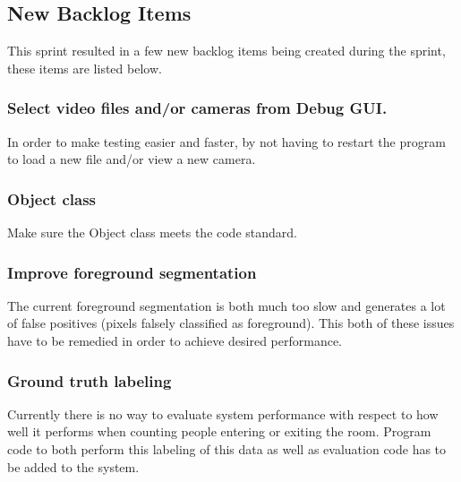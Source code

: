 \subsection{New Backlog Items}
This sprint resulted in a few new backlog items being created during the sprint, these items are listed below.

\subsubsection{Select video files and/or cameras from Debug GUI.}
In order to make testing easier and faster, by not having to restart the program to load a new file and/or view a new camera.

\subsubsection{Object class}
Make sure the Object class meets the code standard.

\subsubsection{Improve foreground segmentation}
The current foreground segmentation is both much too slow and generates a lot of false positives (pixels falsely classified as foreground). This both of these issues have to be remedied in order to achieve desired performance.

\subsubsection{Ground truth labeling}
Currently there is no way to evaluate system performance with respect to how well it performs when counting people entering or exiting the room. Program code to both perform this labeling of this data as well as evaluation code has to be added to the system.
